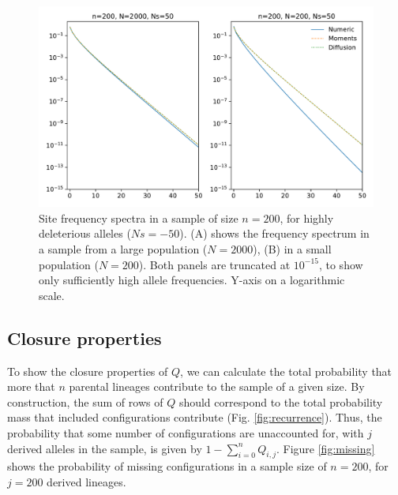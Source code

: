 \documentclass[review]{elsarticle}
\begin{document}
\begin{figure}
  \centering
  \includegraphics[width=0.7\textheight]{fig/strong_selection.pdf}
  \caption{Site frequency spectra in a sample of size $n=200$, for highly deleterious alleles
    ($Ns=-50$). (A) shows the frequency spectrum in a sample from a large population ($N=2000$), (B)
  in a small population ($N=200$). Both panels are truncated at $10^{-15}$, to show only
  sufficiently high allele frequencies. Y-axis on a logarithmic scale.}
  \label{fig:strong-selection}
\end{figure}

\subsection{Closure properties}
\label{subsec:closure}

To show the closure properties of $Q$, we can calculate the total probability that more that $n$
parental lineages contribute to the sample of a given size. By construction, the sum of rows of $Q$
should correspond to the total probability mass that included configurations contribute
(Fig. \ref{fig:recurrence}). Thus, the probability that some number of configurations are
unaccounted for, with $j$ derived alleles in the sample, is given by
$1-\sum_{i=0}^{n}Q_{i,j}$. Figure \ref{fig:missing} shows the probability of missing configurations
in a sample size of $n=200$, for $j=200$ derived lineages.
\end{document}
